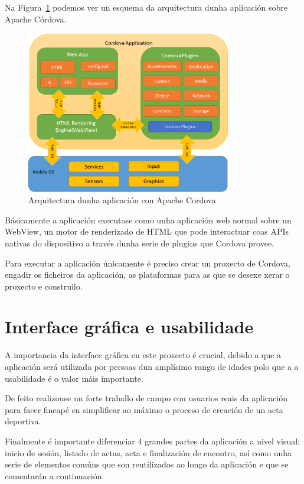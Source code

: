   Na Figura~\ref{fig:design:cordova_arquitectura} podemos ver un esquema da 
arquitectura dunha aplicación sobre Apache Córdova.

    \begin{figure}[h!]
      \begin{center}
      \includegraphics[width=0.8\textwidth]{./img/cordova_arquitectura.png}
      \caption{Arquitectura dunha aplicación con Apache Cordova}
      \label{fig:design:cordova_arquitectura}
      \end{center}
    \end{figure}

  Básicamente a aplicación executase como unha aplicación web normal sobre un 
WebView, un motor de renderizado de HTML que pode interactuar coas APIs nativas 
do dispositivo a través dunha serie de plugins que Cordova provee.

  Para executar a aplicación únicamente é preciso crear un proxecto de Cordova, 
engadir os ficheiros da aplicación, as plataformas para as que se desexe xerar 
o proxecto e construilo.
\clearpage
  \section{Interface gráfica e usabilidade}
  A importancia da interface gráfica en este proxecto é crucial, debido a que a 
aplicación será utilizada por persoas dun amplísimo rango de idades polo que a
a usabilidade é o valor máis importante.

  De feito realizouse un forte traballo de campo con usuarios reais da 
aplicación para facer fincapé en simplificar ao máximo o proceso de creación de 
un acta deportiva.

  Finalmente é importante diferenciar 4 grandes partes da aplicación a nivel 
visual: inicio de sesión, listado de actas, acta e finalización de encontro, 
así como unha serie de elementos comúns que son reutilizados ao longo da 
aplicación e que se comentarán a continuación.

